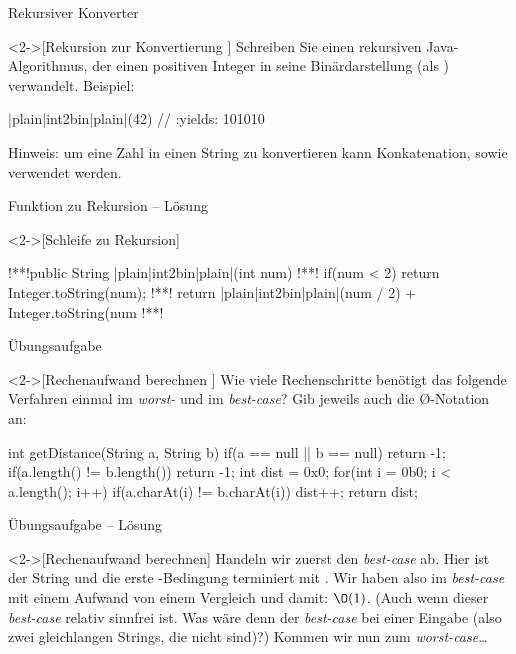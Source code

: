 \begin{frame}[fragile,c]{Rekursiver Konverter}
    \begin{exercise}<2->[Rekursion zur Konvertierung ]
        \pause{}Schreiben Sie einen rekursiven Java-Algorithmus, der einen positiven Integer in seine Binärdarstellung (als ) verwandelt.\pause{}
        Beispiel:\pause{}
\begin{plainjava}
|plain|int2bin|plain|(42) // :yields: 101010
\end{plainjava}
    \pause{}Hinweis: um eine Zahl in einen String zu konvertieren kann Konkatenation,\pause{} sowie  verwendet werden.
    \end{exercise}
\end{frame}

\begin{frame}[fragile,c]{Funktion zu Rekursion -- Lösung}
    \begin{solve}<2->[Schleife zu Rekursion]
\begin{plainjava}
!**!public String |plain|int2bin|plain|(int num){
!**!    if(num < 2) return Integer.toString(num);
!**!    return |plain|int2bin|plain|(num / 2) + Integer.toString(num %
!**!}
\end{plainjava}
    \end{solve}
\end{frame}


\begin{frame}[fragile,c]{Übungsaufgabe}
    \begin{exercise}<2->[Rechenaufwand berechnen ]
        \pause{}Wie viele Rechenschritte benötigt das folgende Verfahren einmal im \emph{worst-} und im \emph{best-case}? Gib jeweils auch die \O-Notation an: \pause{}
\begin{plainjava}
int getDistance(String a, String b){
    if(a == null || b == null) return -1;
    if(a.length() != b.length()) return -1;
    int dist = 0x0;
    for(int i = 0b0; i < a.length(); i++)
        if(a.charAt(i) != b.charAt(i))
            dist++;
    return dist;
}
\end{plainjava}
    \end{exercise}
\end{frame}

\begin{frame}[c]{Übungsaufgabe -- Lösung}
    \begin{solve}<2->[Rechenaufwand berechnen]
    \pause{}Handeln wir zuerst den \emph{best-case} ab.\pause{} Hier ist der String   und die erste -Bedingung terminiert mit .\pause{} Wir haben also im \emph{best-case} mit einem Aufwand von einem Vergleich und damit: \(\O(1)\).\pause{} (Auch wenn dieser \emph{best-case} relativ sinnfrei ist.\pause{} Was wäre denn der \emph{best-case} bei einer  Eingabe\pause{} (also zwei gleichlangen Strings, die nicht  sind)?)\pause{} Kommen wir nun zum \emph{worst-case}\ldots
    \end{solve}
\end{frame}

